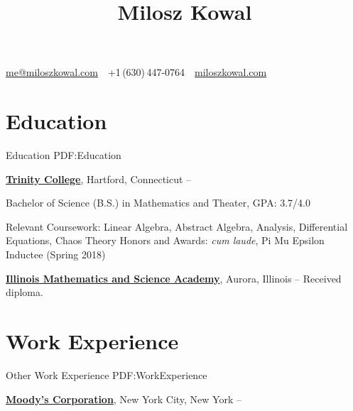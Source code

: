 \documentclass[letterpaper,10pt,oneside]{article}
\newcommand{\CVAuthor}{Milosz Kowal}
\newcommand{\CVWebpage}{https://miloszkowal.com}
\begin{document}

\title{\CVAuthor}

\begin{subtitle}
\par
\href{mailto:me@miloszkowal.com}
{me@miloszkowal.com}
\,\SubBulletSymbol\,
+1\,(630)\,447-0764
\,\SubBulletSymbol\,
\href{\CVWebpage}
{miloszkowal.com}
\end{subtitle}

\begin{body}


\section
{Education}
{Education}
{PDF:Education}

\href{http://www.trincoll.edu}
{\textbf{Trinity College}},
Hartford, Connecticut
\hfill
{} --

\GapNoBreak
\BulletItem
Bachelor of Science (B.S.) in
Mathematics and Theater, GPA: 3.7/4.0
\begin{detail}
\SubBulletItem
Relevant Coursework: Linear Algebra, Abstract Algebra, Analysis, Differential Equations, Chaos Theory
\SubBulletItem
Honors and Awards: \textit{cum laude}, Pi Mu Epsilon Inductee (Spring 2018)
\end{detail}

\GapNoBreak
\href{http://www.imsa.edu}
{\textbf{Illinois Mathematics and Science Academy}},
Aurora, Illinois
\hfill
{} --
\GapNoBreak
\BulletItem
Received diploma.


\noindent\hrulefill
\section
{Work\newline
Experience}
{Other Work Experience}
{PDF:WorkExperience}

\href{http://www.moodys.com}
{\textbf{Moody's Corporation}},
New York City, New York
\hfill
{} --


\end{body}
\end{document}
